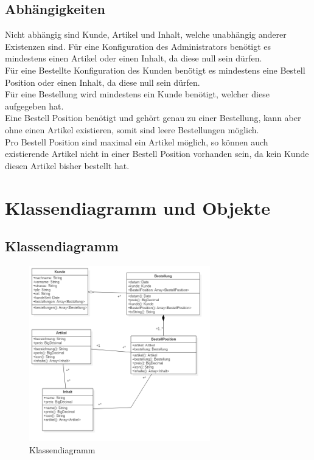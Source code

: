 \documentclass{article}
\begin{document}
\subsection{Abhängigkeiten}
Nicht abhängig sind Kunde, Artikel und Inhalt, welche unabhängig anderer Existenzen sind.
Für eine Konfiguration des Administrators benötigt es mindestens einen Artikel oder einen Inhalt, da diese null sein dürfen.\\
Für eine Bestellte Konfiguration des Kunden benötigt es mindestens eine Bestell Position oder einen Inhalt, da diese null sein dürfen.\\
Für eine Bestellung wird mindestens ein Kunde benötigt, welcher diese aufgegeben hat.\\
Eine Bestell Position benötigt und gehört genau zu einer Bestellung, kann aber ohne einen Artikel existieren, somit sind leere Bestellungen möglich.\\
Pro Bestell Position sind maximal ein Artikel möglich, so können auch existierende Artikel nicht in einer Bestell Position vorhanden sein, da kein Kunde diesen Artikel bisher bestellt hat.\\
\section{Klassendiagramm und Objekte}
\subsection{Klassendiagramm}
\begin{figure}[h]
\begin{center}
\includegraphics[width=0.7\textwidth]{res/uml.png}
\caption{Klassendiagramm}
\label{klassendiagramm}
\end{center}
\end{figure}
\end{document}
